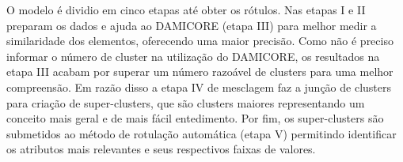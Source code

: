 O modelo é dividio em cinco etapas até obter os rótulos. Nas etapas I e II preparam os dados e ajuda ao DAMICORE (etapa III) para melhor medir a similaridade dos elementos, oferecendo uma maior precisão. Como não é preciso informar o número de cluster na utilização do DAMICORE, os resultados na etapa III acabam por superar um número razoável de clusters para uma melhor compreensão. Em razão disso a etapa IV de mesclagem faz a junção de clusters para criação de super-clusters, que são clusters maiores representando um conceito mais geral e de mais fácil entedimento. Por fim, os super-clusters são submetidos ao método de rotulação automática (etapa V) permitindo identificar os atributos mais relevantes e seus respectivos faixas de valores.








